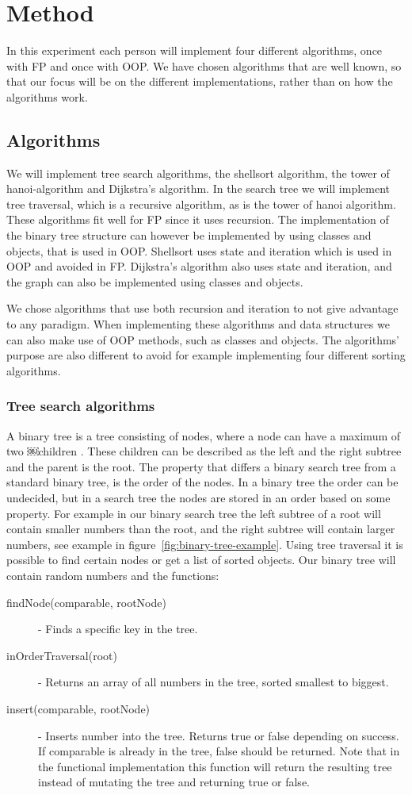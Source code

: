 \documentclass {article}
\begin{document}
\section{Method}
In this experiment each person will implement four different algorithms, once with FP and once with OOP. We have chosen algorithms that are well known, so that our focus will be on the different implementations, rather than on how the algorithms work. 
\subsection{Algorithms}
We will implement tree search algorithms, the shellsort algorithm, the tower of hanoi-algorithm and Dijkstra's algorithm. In the search tree we will implement tree traversal, which is a recursive algorithm, as is the tower of hanoi algorithm. These algorithms fit well for FP since it uses recursion. The implementation of the binary tree structure can however be implemented by using classes and objects, that is used in OOP. Shellsort uses state and iteration which is used in OOP and avoided in FP. Dijkstra's algorithm also uses state and iteration, and the graph can also be implemented using classes and objects.

We chose algorithms that use both recursion and iteration to not give advantage to any paradigm. When implementing these algorithms and data structures we can also make use of OOP methods, such as classes and objects. The algorithms' purpose are also different to avoid for example implementing four different sorting algorithms. 
\subsubsection{Tree search algorithms}
A binary tree is a tree consisting of nodes, where a node can have a maximum of two ￼children \cite{weiss}. These children can be described as the left and the right subtree and the parent is the root. The property that differs a binary search tree from a standard binary tree, is the order of the nodes. In a binary tree the order can be undecided, but in a search tree the nodes are stored in an order based on some property. For example in our binary search tree the left subtree of a root will contain smaller numbers than the root, and the right subtree will contain larger numbers, see example in figure~\ref{fig:binary-tree-example}. Using tree traversal it is possible to find certain nodes or get a list of sorted objects. Our binary tree will contain random numbers and the functions:
\begin{description}
\item [findNode(comparable, rootNode)] - Finds a specific key in the tree.
\item [inOrderTraversal(root)] - Returns an array of all numbers in the tree, sorted smallest to biggest.
\item [insert(comparable, rootNode)] - Inserts number into the tree. Returns true or false depending on success. If comparable is already in the tree, false should be returned. Note that in the functional implementation this function will return the resulting tree instead of mutating the tree and returning true or false.
\end{description}
\end{document}
